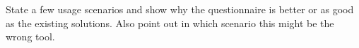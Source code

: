 State a few usage scenarios and show why the questionnaire is better or as good as the existing solutions. Also point out in which scenario this might be the wrong tool.